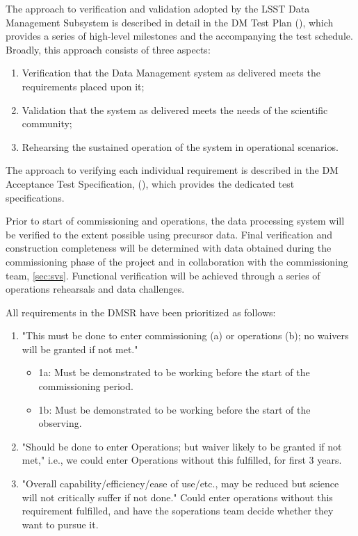 The approach to verification and validation adopted by the LSST Data Management Subsystem is described in detail in the DM Test Plan (), which provides a series of high-level milestones and the accompanying the test schedule.
Broadly, this approach consists of three aspects:
\begin{enumerate}
	\item Verification that the Data Management system as delivered meets the requirements placed upon it;
	\item Validation that the system as delivered meets the needs of the scientific community;
	\item Rehearsing the sustained operation of the system in operational scenarios.
\end{enumerate}
The approach to verifying each individual requirement is described in the DM Acceptance Test Specification, (), which provides the dedicated test specifications.

Prior to start of commissioning and operations, the data processing system will be verified to the extent possible using precursor data.
Final verification and construction completeness will be determined with data obtained during the commissioning phase of the project and in collaboration with the commissioning team, \ref{sec:svs}.
Functional verification will be achieved through a series of operations rehearsals and data challenges.

All requirements in the DMSR have been prioritized as follows:
\begin{enumerate}
	\item "This must be done to enter commissioning (a) or operations (b); no waivers will be granted if not met."
		\begin{itemize}
			\item 1a: Must be demonstrated to be working before the start of the commissioning period.
			\item1b: Must be demonstrated to be working before the start of the observing.
		\end{itemize}
	\item  "Should be done to enter Operations; but waiver likely to be granted if not met," i.e., we could enter Operations without this fulfilled, for first 3 years.
	\item  "Overall capability/efficiency/ease of use/etc., may be reduced but science will not critically suffer if not done." Could enter operations without this requirement fulfilled, and have the soperations team decide whether they want to pursue it.
\end{enumerate}


